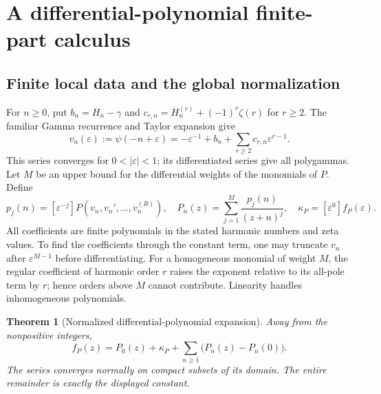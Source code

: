 \documentclass[11pt,a4paper]{article}
\numberwithin{equation}{section}
\newtheorem{theorem}{Theorem}[section]
\theoremstyle{definition}
\theoremstyle{remark}
\begin{document}


\section{A differential-polynomial finite-part calculus}
\label{poly:calculus}

\subsection{Finite local data and the global normalization}

For $n\ge0$, put $b_n=H_n-\gamma$ and
$c_{r,n}=H_n^{(r)}+(-1)^r\zeta(r)$ for $r\ge2$. The familiar
Gamma recurrence and Taylor expansion give
\begin{equation}\label{poly:localpsi}
 v_n(\varepsilon):=\psi(-n+\varepsilon)
 =-\varepsilon^{-1}+b_n+
      \sum_{r\ge2}c_{r,n}\varepsilon^{r-1}.
\end{equation}
This series converges for $0<|\varepsilon|<1$; its differentiated
series give all polygammas. Let $M$ be an upper bound for the differential
weights of the monomials of $P$. Define
\begin{equation}\label{poly:poles}
 p_j(n)=[\varepsilon^{-j}]P(v_n,v_n',\ldots,v_n^{(R)}),\quad
 P_n(z)=\sum_{j=1}^M\frac{p_j(n)}{(z+n)^j},\quad
 \kappa_P=[\varepsilon^0]f_P(\varepsilon).
\end{equation}
All coefficients are finite polynomials in the stated harmonic numbers
and zeta values. To find the coefficients through the constant term,
one may truncate $v_n$ after $\varepsilon^{M-1}$ before differentiating.
For a homogeneous monomial of weight $M$, the regular coefficient of
harmonic order $r$ raises the exponent relative to its all-pole term
by $r$; hence orders above $M$ cannot contribute. Linearity handles
inhomogeneous polynomials.

\begin{theorem}[Normalized differential-polynomial expansion]
\label{poly:ML}
Away from the nonpositive integers,
\begin{equation}\label{poly:MLeq}
 f_P(z)=P_0(z)+\kappa_P+
              \sum_{n\ge1}\bigl(P_n(z)-P_n(0)\bigr).
\end{equation}
The series converges normally on compact subsets of its domain.
The entire remainder is exactly the displayed constant.
\end{theorem}
\end{document}
